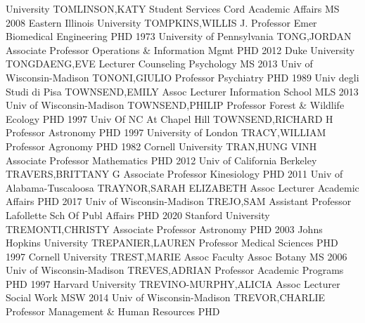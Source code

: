 \documentclass[
]{article}
\begin{document}
University \textbar TOMLINSON,KATY \textbar{} 
\textbar Student Services Cord \textbar Academic Affairs \textbar MS
2008 Eastern Illinois University \textbar TOMPKINS,WILLIS J. \textbar{}
 \textbar Professor Emer \textbar Biomedical Engineering
\textbar PHD 1973 University of Pennsylvania \textbar TONG,JORDAN
\textbar{}  \textbar Associate Professor \textbar Operations
\& Information Mgmt \textbar PHD 2012 Duke University
\textbar TONGDAENG,EVE \textbar{}  \textbar Lecturer
\textbar Counseling Psychology \textbar MS 2013 Univ of
Wisconsin-Madison \textbar TONONI,GIULIO \textbar{} 
\textbar Professor \textbar Psychiatry \textbar PHD 1989 Univ degli
Studi di Pisa \textbar TOWNSEND,EMILY \textbar{} 
\textbar Assoc Lecturer \textbar Information School \textbar MLS 2013
Univ of Wisconsin-Madison \textbar TOWNSEND,PHILIP \textbar{}
 \textbar Professor \textbar Forest \& Wildlife Ecology
\textbar PHD 1997 Univ Of NC At Chapel Hill \textbar TOWNSEND,RICHARD H
\textbar{}  \textbar Professor \textbar Astronomy
\textbar PHD 1997 University of London \textbar TRACY,WILLIAM \textbar{}
 \textbar Professor \textbar Agronomy \textbar PHD 1982
Cornell University \textbar TRAN,HUNG VINH \textbar{} 
\textbar Associate Professor \textbar Mathematics \textbar PHD 2012 Univ
of California Berkeley \textbar TRAVERS,BRITTANY G \textbar{}
 \textbar Associate Professor \textbar Kinesiology
\textbar PHD 2011 Univ of Alabama-Tuscaloosa \textbar TRAYNOR,SARAH
ELIZABETH \textbar{}  \textbar Assoc Lecturer
\textbar Academic Affairs \textbar PHD 2017 Univ of Wisconsin-Madison
\textbar TREJO,SAM \textbar{}  \textbar Assistant Professor
\textbar Lafollette Sch Of Publ Affairs \textbar PHD 2020 Stanford
University \textbar TREMONTI,CHRISTY \textbar{} 
\textbar Associate Professor \textbar Astronomy \textbar PHD 2003 Johns
Hopkins University \textbar TREPANIER,LAUREN \textbar{} 
\textbar Professor \textbar Medical Sciences \textbar PHD 1997 Cornell
University \textbar TREST,MARIE \textbar{}  \textbar Assoc
Faculty Assoc \textbar Botany \textbar MS 2006 Univ of Wisconsin-Madison
\textbar TREVES,ADRIAN \textbar{}  \textbar Professor
\textbar Academic Programs \textbar PHD 1997 Harvard University
\textbar TREVINO-MURPHY,ALICIA \textbar{}  \textbar Assoc
Lecturer \textbar Social Work \textbar MSW 2014 Univ of
Wisconsin-Madison \textbar TREVOR,CHARLIE \textbar{} 
\textbar Professor \textbar Management \& Human Resources \textbar PHD
\end{document}
